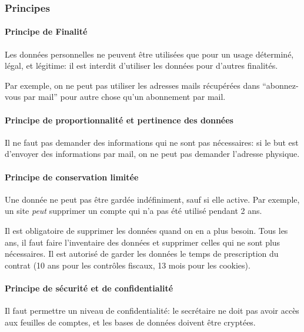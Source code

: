 \documentclass[10pt,a4paper,french]{article}
\begin{document}
\subsubsection{Principes}

\paragraph{Principe de Finalité}
Les données personnelles ne peuvent être utilisées que pour un usage déterminé, légal, et légitime: il est interdit d'utiliser les données pour d'autres finalités.

Par exemple, on ne peut pas utiliser les adresses mails récupérées dans ``abonnez-vous par mail'' pour autre chose qu'un abonnement par mail.

\paragraph{Principe de proportionnalité et pertinence des données}
Il ne faut pas demander des informations qui ne sont pas nécessaires: si le but est d'envoyer des informations par mail, on ne peut pas demander l'adresse physique.

\paragraph{Principe de conservation limitée}
Une donnée ne peut pas être gardée indéfiniment, sauf si elle active.
Par exemple, un site \textit{peut} supprimer un compte qui n'a pas été utilisé pendant 2 ans.

Il est obligatoire de supprimer les données quand on en a plus besoin. Tous les ans, il faut faire l'inventaire des données et supprimer celles qui ne sont plus nécessaires. Il est autorisé de garder les données le temps de prescription du contrat (10 ans pour les contrôles fiscaux, 13 mois pour les cookies).

\paragraph{Principe de sécurité et de confidentialité}
Il faut permettre un niveau de confidentialité: le secrétaire ne doit pas avoir accès aux feuilles de comptes, et les bases de données doivent être cryptées.
\end{document}
